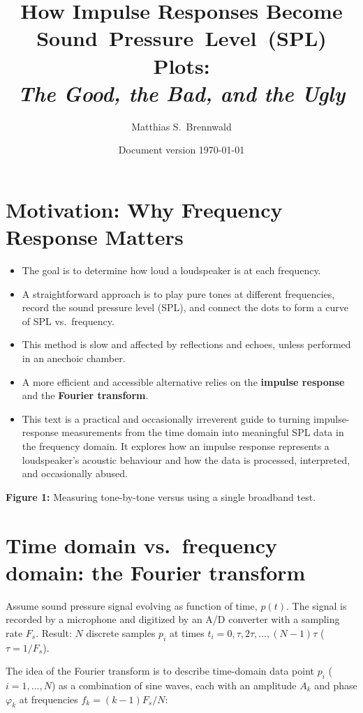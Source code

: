 \documentclass[12pt,a4paper]{article}
\title{How Impulse Responses Become Sound~Pressure~Level~(SPL) Plots:\\[0.7em]\textit{The Good, the Bad, and the Ugly}}
\author{Matthias S.~Brennwald}
\date{Document version \today}
\begin{document}
\maketitle

\section{Motivation: Why Frequency Response Matters}

\begin{itemize}[noitemsep]
    \item The goal is to determine how loud a loudspeaker is at each frequency.
    \item A straightforward approach is to play pure tones at different frequencies, record the sound pressure level (SPL), and connect the dots to form a curve of SPL vs.\ frequency.
    \item This method is slow and affected by reflections and echoes, unless performed in an anechoic chamber.
    \item A more efficient and accessible alternative relies on the \textbf{impulse response} and the \textbf{Fourier transform}.
    \item This text is a practical and occasionally irreverent guide to turning impulse-response measurements from the time domain into meaningful SPL data in the frequency domain. It explores how an impulse response represents a loudspeaker's acoustic behaviour and how the data is processed, interpreted, and occasionally abused.
\end{itemize}

\vspace{1em}
\noindent\textbf{Figure 1:} Measuring tone-by-tone versus using a single broadband test.

\section{Time domain vs.\ frequency domain: the Fourier transform}

Assume sound pressure signal evolving as function of time, \(p(t)\). The signal is recorded by a microphone and digitized by an A/D converter with a sampling rate $F_s$. Result: \(N\) discrete samples \(p_i\) at times $t_i = 0, \tau, 2\tau,\ldots, (N-1)\tau$ ($\tau = 1/F_s$).

The idea of the Fourier transform is to describe time-domain data point $p_i$ ($i = 1,\ldots,N$) as a combination of sine waves, each with an amplitude \(A_k\) and phase \(\varphi_k\) at frequencies $f_k = (k-1)F_s/N$:
\end{document}
